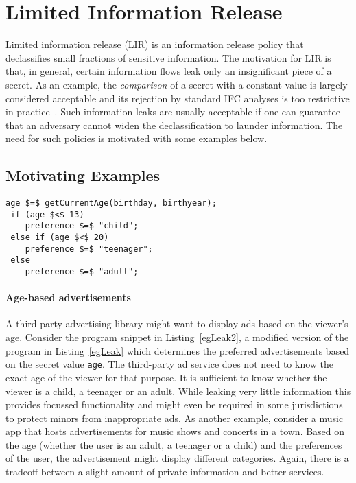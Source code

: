 \section{Limited Information Release}
\label{sec:lir-desc}
Limited information release (LIR) is an information release policy that
declassifies small fractions of sensitive information. The motivation
for LIR is that, in general, certain information flows leak only an
insignificant piece of a secret. As an example, the
\emph{comparison} of a secret with a constant value is largely considered
acceptable and its rejection by standard IFC analyses is too restrictive in
practice~\cite{scd,dta}. Such information leaks are usually acceptable if one
can guarantee that an adversary cannot widen the declassification to launder
information. The need for such policies is motivated with some
examples below. 

\subsection{Motivating Examples}
\label{sec:examples}
\begin{lstlisting}[float,caption=Age-based Advertisement, label=egLeak2]
 age $=$ getCurrentAge(birthday, birthyear);
 if (age $<$ 13)
    preference $=$ "child";
 else if (age $<$ 20)
    preference $=$ "teenager";
 else 
    preference $=$ "adult";
\end{lstlisting}

\paragraph{Age-based advertisements}
A third-party advertising library might want to display ads %
based on the viewer's age. Consider the program snippet in
Listing~\ref{egLeak2}, a modified version of the program in
Listing~\ref{egLeak} which determines the preferred advertisements based on the
secret value \texttt{age}. The third-party ad service does not 
need to know the exact age of the viewer for that purpose. It is
sufficient to know whether the viewer is
a child, a teenager or an adult. While leaking very little information
this provides focussed functionality and might
even be required in some jurisdictions to protect minors from inappropriate
ads. As another example, consider a music app that hosts
advertisements for music shows and concerts in a town. Based
on the age (whether the user is an adult, a teenager or a child) and
the preferences of the user, the advertisement might display different
categories. Again, there is a tradeoff between a slight amount of
private information and better services. %

